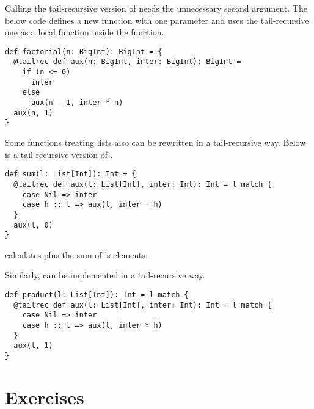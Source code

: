 Calling the tail-recursive version of  needs the unnecessary
second argument. The below code defines a new  function with one
parameter and uses the tail-recursive one as a local function inside the
function.

\begin{verbatim}
def factorial(n: BigInt): BigInt = {
  @tailrec def aux(n: BigInt, inter: BigInt): BigInt =
    if (n <= 0)
      inter
    else
      aux(n - 1, inter * n)
  aux(n, 1)
}
\end{verbatim}

Some functions treating lists also can be rewritten in a tail-recursive way.
Below is a tail-recursive version of .

\begin{verbatim}
def sum(l: List[Int]): Int = {
  @tailrec def aux(l: List[Int], inter: Int): Int = l match {
    case Nil => inter
    case h :: t => aux(t, inter + h)
  }
  aux(l, 0)
}
\end{verbatim}

 calculates  plus the sum of 's elements.

Similarly,  can be implemented in a tail-recursive way.

\begin{verbatim}
def product(l: List[Int]): Int = l match {
  @tailrec def aux(l: List[Int], inter: Int): Int = l match {
    case Nil => inter
    case h :: t => aux(t, inter * h)
  }
  aux(l, 1)
}
\end{verbatim}

\section{Exercises}

